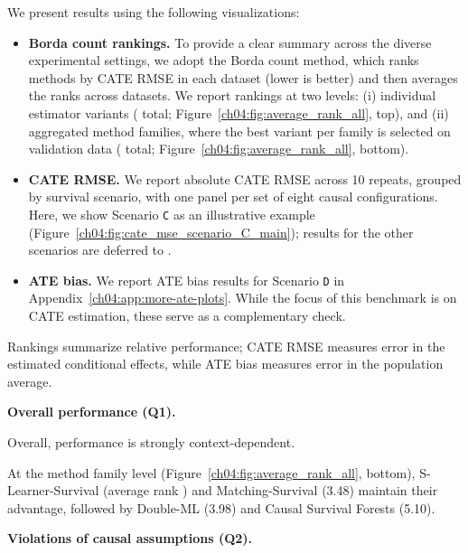 We present results using the following visualizations: 
\begin{itemize}

    \item \textbf{Borda count rankings.} {To provide a clear summary across the diverse experimental settings, we adopt the Borda count method, which ranks methods by CATE RMSE in each dataset (lower is better) and then averages the ranks across datasets.
We report rankings at two levels: (i) individual estimator variants ( total; Figure~\ref{ch04:fig:average_rank_all}, top), and (ii) aggregated method families, where the best variant per family is selected on validation data ( total; Figure~\ref{ch04:fig:average_rank_all}, bottom).}

    \item \textbf{CATE RMSE.} We report absolute CATE RMSE across 10 repeats, grouped by survival scenario, with one panel per set of eight causal configurations.
Here, we show Scenario \texttt{C} as an illustrative example (Figure~\ref{ch04:fig:cate_mse_scenario_C_main}); results for the other scenarios are deferred to \citet[Appendix F.4, Figures 8--12]{noroozizadeh2026survhte}.

    \item \textbf{ATE bias.} We report ATE bias results for Scenario \texttt{D} in Appendix~\ref{ch04:app:more-ate-plots}.
While the focus of this benchmark is on CATE estimation, these serve as a complementary check.

\end{itemize}

Rankings summarize relative performance; CATE RMSE measures error in the estimated conditional effects, while ATE bias measures error in the population average.

\setlength{\tabcolsep}{2pt}



\textbf{Overall performance (Q1).}

Overall, performance is strongly context-dependent.

At the method family level (Figure~\ref{ch04:fig:average_rank_all}, bottom), S-Learner-Survival (average rank ) and Matching-Survival (3.48) maintain their advantage, followed by Double-ML (3.98) and Causal Survival Forests (5.10).

\textbf{Violations of causal assumptions (Q2).}

